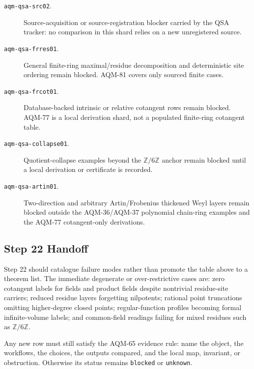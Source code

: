 \begin{description}
\item[\texttt{aqm-qsa-src02}.]
Source-acquisition or source-registration blocker carried by the QSA tracker:
no comparison in this shard relies on a new unregistered source.
\item[\texttt{aqm-qsa-frres01}.]
General finite-ring maximal/residue decomposition and deterministic site
ordering remain blocked.  AQM-81 covers only sourced finite cases.
\item[\texttt{aqm-qsa-frcot01}.]
Database-backed intrinsic or relative cotangent rows remain blocked.  AQM-77
is a local derivation shard, not a populated finite-ring cotangent table.
\item[\texttt{aqm-qsa-collapse01}.]
Quotient-collapse examples beyond the \(\mathbb Z/6\mathbb Z\) anchor remain
blocked until a local derivation or certificate is recorded.
\item[\texttt{aqm-qsa-artin01}.]
Two-direction and arbitrary Artin/Frobenius thickened Weyl layers remain
blocked outside the AQM-36/AQM-37 polynomial chain-ring examples and the
AQM-77 cotangent-only derivations.
\end{description}

\subsection{Step 22 Handoff}

Step 22 should catalogue failure modes rather than promote the table above to
a theorem list.  The immediate degenerate or over-restrictive cases are:
zero cotangent labels for fields and product fields despite nontrivial
residue-site carriers; reduced residue layers forgetting nilpotents; rational
point truncations omitting higher-degree closed points; regular-function
profiles becoming formal infinite-volume labels; and common-field readings
failing for mixed residues such as \(\mathbb Z/6\mathbb Z\).

Any new row must still satisfy the AQM-65 evidence rule: name the object, the
workflows, the choices, the outputs compared, and the local map, invariant,
or obstruction.  Otherwise its status remains \texttt{blocked} or
\texttt{unknown}.
